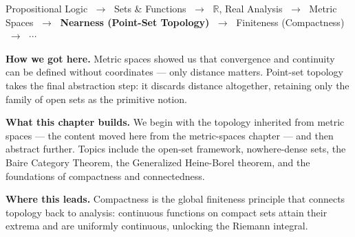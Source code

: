 
\begin{tcolorbox}[
  colback=gray!6,
  colframe=gray!40,
  arc=2pt,
  left=8pt, right=8pt, top=6pt, bottom=6pt,
  title={\small\textbf{Where You Are in the Journey}},
  fonttitle=\small\bfseries
]
\begin{center}
\small
Propositional Logic
$\;\to\;$ Sets \& Functions
$\;\to\;$ $\mathbb{R}$, Real Analysis
$\;\to\;$ Metric Spaces
$\;\to\;$ \textbf{Nearness (Point-Set Topology)}
$\;\to\;$ Finiteness (Compactness)
$\;\to\;$ $\cdots$
\end{center}

\medskip
\noindent\textbf{How we got here.}
Metric spaces showed us that convergence and continuity can be defined
without coordinates --- only distance matters.
Point-set topology takes the final abstraction step: it discards
distance altogether, retaining only the family of open sets
as the primitive notion.

\medskip
\noindent\textbf{What this chapter builds.}
We begin with the topology inherited from metric spaces --- the content
moved here from the metric-spaces chapter --- and then abstract further.
Topics include the open-set framework, nowhere-dense sets, the Baire
Category Theorem, the Generalized Heine-Borel theorem, and the foundations
of compactness and connectedness.

\medskip
\noindent\textbf{Where this leads.}
Compactness is the global finiteness principle that connects topology
back to analysis: continuous functions on compact sets attain their
extrema and are uniformly continuous, unlocking the Riemann integral.
\end{tcolorbox}
\vspace{1em}

